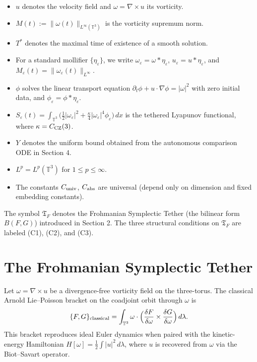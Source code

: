 \documentclass[11pt,a4paper]{article}
\begin{document}
\begin{itemize}
\item $u$ denotes the velocity field and $\omega = \nabla \times u$ its vorticity.
\item $M(t) := \|\omega(t)\|_{L^\infty(\mathbb{T}^3)}$ is the vorticity supremum norm.
\item $T^*$ denotes the maximal time of existence of a smooth solution.
\item For a standard mollifier $\{\eta_\varepsilon\}$, we write $\omega_\varepsilon = \omega * \eta_\varepsilon$, $u_\varepsilon = u * \eta_\varepsilon$, and $M_\varepsilon(t) = \|\omega_\varepsilon(t)\|_{L^\infty}$.
\item $\phi$ solves the linear transport equation $\partial_t\phi + u\cdot\nabla\phi = |\omega|^2$ with zero initial data, and $\phi_\varepsilon = \phi * \eta_\varepsilon$.
\item $S_\varepsilon(t) = \int_{\mathbb{T}^3} \bigl(\frac12|\omega_\varepsilon|^2 + \frac{\kappa}{4}|\omega_\varepsilon|^4\phi_\varepsilon\bigr)\,dx$ is the tethered Lyapunov functional, where $\kappa = C_{\rm CZ}(3)$.
\item $Y$ denotes the uniform bound obtained from the autonomous comparison ODE in Section 4.
\item $L^p = L^p(\mathbb{T}^3)$ for $1 \leq p \leq \infty$.
\item The constants $C_{\rm univ}$, $C_{\rm abs}$ are universal (depend only on dimension and fixed embedding constants).
\end{itemize}

The symbol $\mathfrak{T}_F$ denotes the Frohmanian Symplectic Tether (the bilinear form $B(F,G)$) introduced in Section 2. The three structural conditions on $\mathfrak{T}_F$ are labeled (C1), (C2), and (C3).

\section{The Frohmanian Symplectic Tether}

Let $\omega = \nabla \times u$ be a divergence-free vorticity field on the three-torus. The classical Arnold Lie–Poisson bracket on the coadjoint orbit through $\omega$ is
\[
\{F, G\}_{\rm classical} = \int_{\mathbb{T}^3} \omega \cdot \Bigl( \frac{\delta F}{\delta \omega} \times \frac{\delta G}{\delta \omega} \Bigr) \, d\lambda.
\]
This bracket reproduces ideal Euler dynamics when paired with the kinetic-energy Hamiltonian $H[\omega] = \frac12 \int |u|^2 \, d\lambda$, where $u$ is recovered from $\omega$ via the Biot–Savart operator.
\end{document}
